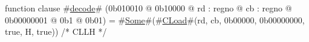 function clause #\hyperref[zdecode]{decode}# (0b010010 @ 0b10000 @ rd : regno @ cb : regno @ 0b00000001 @ 0b1 @ 0b01) = #\hyperref[zSome]{Some}#(#\hyperref[zCLoad]{CLoad}#(rd, cb, 0b00000, 0b00000000, true,  H, true)) /* CLLH  */

